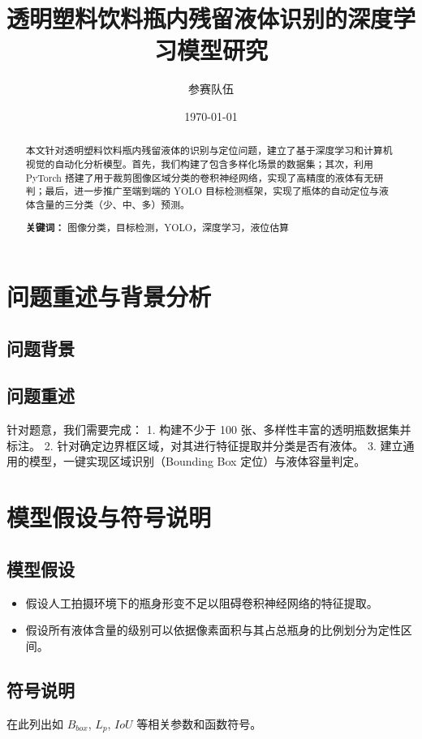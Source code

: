\documentclass[12pt,a4paper]{ctexart}
\title{透明塑料饮料瓶内残留液体识别的深度学习模型研究}
\author{参赛队伍}
\date{\today}
\begin{document}
\maketitle

\begin{abstract}
本文针对透明塑料饮料瓶内残留液体的识别与定位问题，建立了基于深度学习和计算机视觉的自动化分析模型。首先，我们构建了包含多样化场景的数据集；其次，利用 PyTorch 搭建了用于裁剪图像区域分类的卷积神经网络，实现了高精度的液体有无研判；最后，进一步推广至端到端的 YOLO 目标检测框架，实现了瓶体的自动定位与液体含量的三分类（少、中、多）预测。

\textbf{关键词：} 图像分类，目标检测，YOLO，深度学习，液位估算
\end{abstract}

\newpage
\tableofcontents
\newpage

\section{问题重述与背景分析}
\subsection{问题背景}
\subsection{问题重述}
针对题意，我们需要完成：
1. 构建不少于 100 张、多样性丰富的透明瓶数据集并标注。
2. 针对确定边界框区域，对其进行特征提取并分类是否有液体。
3. 建立通用的模型，一键实现区域识别（Bounding Box 定位）与液体容量判定。

\section{模型假设与符号说明}
\subsection{模型假设}
\begin{itemize}
    \item 假设人工拍摄环境下的瓶身形变不足以阻碍卷积神经网络的特征提取。
    \item 假设所有液体含量的级别可以依据像素面积与其占总瓶身的比例划分为定性区间。
\end{itemize}
\subsection{符号说明}
在此列出如 $B_{box}$, $L_p$, $IoU$ 等相关参数和函数符号。
\end{document}
